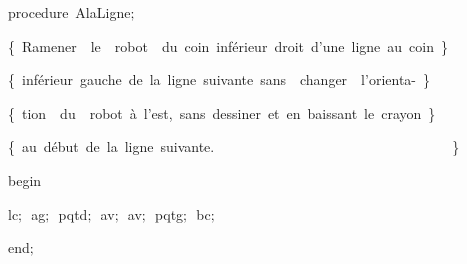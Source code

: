 {\pagebreak[3] 
\vspace{\neglskip}\mbox{\blc  \blk\idt  \mcl procedure\idt \ AlaLigne$;$}\par 
\vspace{\neglskip}\mbox{\blc  \blk\blk\idt  \cmt  \{\ Ramener\ \ le\ \ robot\ \ du\ coin\ inf\'{e}rieur\ droit\ d{'}une\ ligne\ au\ coin\ \}\idt }\par 
\vspace{\neglskip}\mbox{\blc  \blk\blk\idt  \cmt  \{\ inf\'{e}rieur\ gauche\ de\ la\ ligne\ suivante\ sans\ \ changer\ \ l{'}orienta-\ \}\idt }\par 
\vspace{\neglskip}\mbox{\blc  \blk\blk\idt  \cmt  \{\ tion\ \ du\ \ robot\ \`{a}\ l{'}est,\ sans\ dessiner\ et\ en\ baissant\ le\ crayon\ \}\idt }\par 
\vspace{\neglskip}\mbox{\blc  \blk\blk\idt  \cmt  \{\ au\ d\'{e}but\ de\ la\ ligne\ suivante.\ \ \ \ \ \ \ \ \ \ \ \ \ \ \ \ \ \ \ \ \ \ \ \ \ \ \ \ \ \ \ \ \ \ \}\idt }\par 
\vspace{\neglskip}\mbox{\blc  \blk\idt  \mcl begin\idt }\par 
\vspace{\neglskip}\mbox{\blc  \blk\blk\idt  lc$;$\ ag$;$\ pqtd$;$\ av$;$\ av$;$\ pqtg$;$\ bc$;$}\par 
\vspace{\neglskip}\mbox{\blc  \blk\idt  \mcl end\idt $;$}\par 
\medskip

}
